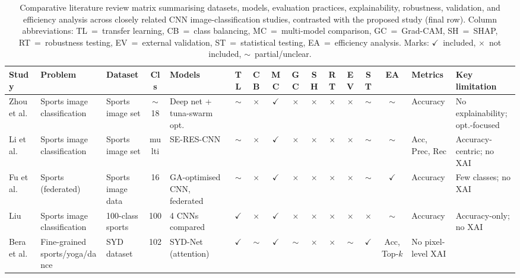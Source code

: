 \documentclass[review]{elsarticle}
\newcommand{\cmark}{\ensuremath{\checkmark}}
\newcommand{\xmark}{\ensuremath{\times}}
\newcommand{\pmark}{\ensuremath{\sim}}
\begin{document}
\begin{table}
\centering
\caption{Comparative literature review matrix summarising datasets, models, evaluation practices,
explainability, robustness, validation, and efficiency analysis across closely related
CNN image-classification studies, contrasted with the proposed study (final row). Column
abbreviations: TL~=~transfer learning, CB~=~class balancing, MC~=~multi-model comparison,
GC~=~Grad-CAM, SH~=~SHAP, RT~=~robustness testing, EV~=~external validation, ST~=~statistical
testing, EA~=~efficiency analysis. Marks: \cmark{}~included, \xmark{}~not included, \pmark{}~partial/unclear.}
\label{tab:litmatrix}
\tiny
\setlength{\tabcolsep}{2.5pt}
\renewcommand{\arraystretch}{1.15}
\begin{tabular}{@{}p{1.5cm}p{1.6cm}p{1.4cm}cp{1.8cm}ccccccccc p{1.5cm}p{2.1cm}@{}}
\toprule
\textbf{Study} & \textbf{Problem} & \textbf{Dataset} & \textbf{Cls} & \textbf{Models} &
\textbf{TL} & \textbf{CB} & \textbf{MC} & \textbf{GC} & \textbf{SH} & \textbf{RT} & \textbf{EV} &
\textbf{ST} & \textbf{EA} & \textbf{Metrics} & \textbf{Key limitation} \\
\midrule
Zhou et al.\ \citep{zhou2024tuna} & Sports image classification & Sports image set & $\sim$18 & Deep net + tuna-swarm opt. & \pmark & \xmark & \cmark & \xmark & \xmark & \xmark & \xmark & \pmark & \pmark & Accuracy & No explainability; opt.-focused \\
Li et al.\ \citep{li2024seres} & Sports image classification & Sports image set & multi & SE-RES-CNN & \pmark & \xmark & \cmark & \xmark & \xmark & \xmark & \xmark & \pmark & \pmark & Acc, Prec, Rec & Accuracy-centric; no XAI \\
Fu et al.\ \citep{fu2024federated} & Sports (federated) & Sports image data & 16 & GA-optimised CNN, federated & \pmark & \xmark & \cmark & \xmark & \xmark & \xmark & \xmark & \pmark & \cmark & Accuracy & Few classes; no XAI \\
Liu \citep{liu2024comparison} & Sports image classification & 100-class sports & 100 & 4 CNNs compared & \cmark & \xmark & \cmark & \xmark & \xmark & \xmark & \xmark & \xmark & \pmark & Accuracy & Accuracy-only; no XAI \\
Bera et al.\ \citep{bera2023finegrained} & Fine-grained sports/yoga/dance & SYD dataset & 102 & SYD-Net (attention) & \cmark & \pmark & \cmark & \pmark & \xmark & \xmark & \pmark & \cmark & Acc, Top-$k$ & No pixel-level XAI \\

\end{tabular}
\end{table}
\end{document}
